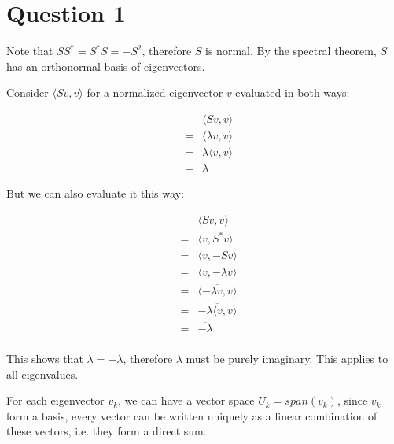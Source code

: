 \section*{Question 1}
Note that $ SS^* = S^*S = -S^2 $, therefore $ S $ is normal. By the spectral theorem, $ S $ has an orthonormal basis of eigenvectors.

Consider $ \langle Sv , v \rangle $ for a normalized eigenvector $ v $ evaluated in both ways:

\begin{eqnarray*}
  & & \langle Sv , v \rangle      \\
  &=& \langle \lambda v, v \rangle \\
  &=& \lambda \langle v, v \rangle \\
  &=& \lambda 
\end{eqnarray*}

But we can also evaluate it this way:

\begin{eqnarray*}
  & & \langle Sv , v \rangle   \\
  &=& \langle v, S^* v \rangle \\
  &=& \langle v, -Sv \rangle   \\
  &=& \langle v, -\lambda v \rangle   \\
  &=& \overline{ \langle -\lambda v, v \rangle }  \\
  &=& \overline{ -\lambda \langle  v, v \rangle }  \\
  &=& \overline{ -\lambda }  \\
\end{eqnarray*}

This shows that $ \lambda = \overline{-\lambda} $, therefore $ \lambda $ must be purely imaginary. This applies to all eigenvalues.

For each eigenvector $ v_k $, we can have a vector space $ U_k = span(v_k) $, since $ v_k $ form a basis, every vector can be written uniquely as a linear combination of these vectors, i.e. they form a direct sum.